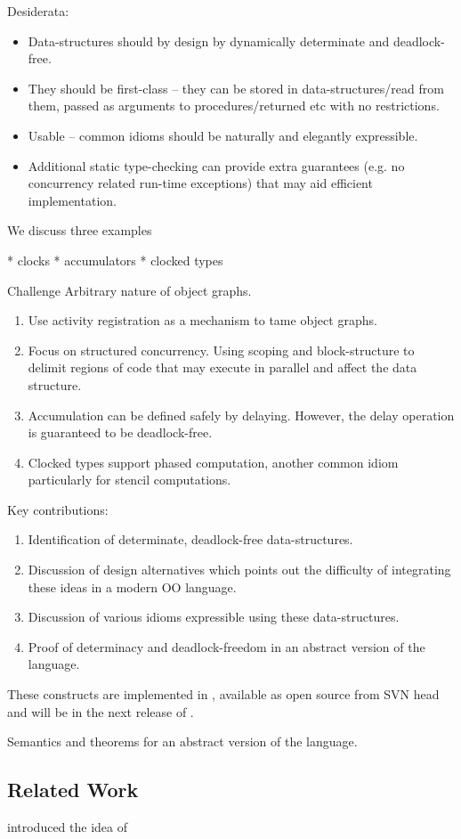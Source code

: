 
Desiderata:

\begin{itemize}
\item Data-structures should by design by dynamically determinate and
   deadlock-free.
\item They should be first-class -- they can be stored in
  data-structures/read from them, passed as arguments to
  procedures/returned etc with no restrictions.
\item Usable -- common idioms should be naturally and elegantly expressible.
\item Additional static type-checking can provide extra guarantees
  (e.g.{} no concurrency related run-time exceptions) that may aid
  efficient implementation.
\end{itemize}

We discuss three examples

  * clocks
  * accumulators
  * clocked types

Challenge
  Arbitrary nature of object graphs.


{\em
\begin{enumerate}
\item Use activity registration as a mechanism to tame object graphs.
\item Focus on structured concurrency. Using scoping and block-structure
    to delimit regions of code that may execute in parallel and affect
    the data structure.

\item Accumulation can be defined safely by delaying. However, the delay
    operation is guaranteed to be deadlock-free.

\item Clocked types support phased computation, another common idiom
    particularly for stencil computations.
\end{enumerate}
}

Key contributions:
{\em
\begin{enumerate}
\item Identification of determinate, deadlock-free data-structures.
\item Discussion of design alternatives which points out the
  difficulty of integrating these ideas in a modern OO language.
\item Discussion of various idioms expressible using these data-structures.
\item Proof of determinacy and deadlock-freedom in an abstract version
  of the language.
\end{enumerate}
These constructs are implemented in \Xten, available as open source from
SVN head and will be in the next release of \Xten.
}


Semantics and theorems for an abstract version of the language.


\subsection{Related Work}

\cite{Steele:1989:MAP:96709.96731} introduced the idea of
